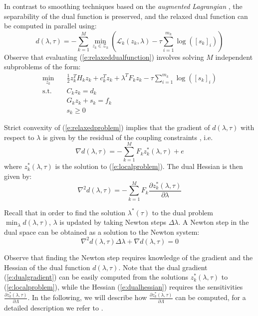 In contrast to smoothing techniques based on the \emph{augmented Lagrangian} \cite{Kozma2013}, the separability of the dual function is preserved, and the relaxed dual function can be computed in parallel using:
\begin{equation}
\label{e:relaxeddualfunction}
d(\lambda, \tau) = -\sum_{k=1}^M \min_{z_k \in \mathcal{Z}_k} \left( \mathcal{L}_k(z_k, \lambda) - \tau \sum_{i=1}^{m_k} \log([s_k]_i) \right)
\end{equation}
Observe that evaluating (\ref{e:relaxeddualfunction}) involves solving $M$ independent subproblems of the form:
\begin{equation}
\label{e:localproblem}
\begin{aligned}
\min_{z_k} & \quad \frac{1}{2}z_k^T H_k z_k + c_k^T z_k + \lambda^TF_k z_k - \tau \sum_{i=1}^{m_k} \log([s_k]_i) \\
\text{s.t.} & \quad C_k z_k = d_k \\ 
& \quad G_k z_k + s_k = f_k \\
& \quad s_k \geq 0
\end{aligned}
\end{equation}

Strict convexity of (\ref{e:relaxedproblem}) implies that the gradient of $d(\lambda, \tau)$ with respect to $\lambda$ is given by the residual of the coupling constraints \cite{Bertsekas1989}, i.e.
\begin{equation}
\label{e:dualgradient}
\nabla d(\lambda, \tau) = -\sum_{k=1}^M F_k z_k^*(\lambda, \tau) + e
\end{equation}
where $z_k^*(\lambda, \tau)$ is the solution to (\ref{e:localproblem}).
The dual Hessian is then given by:
\begin{equation}
\label{e:dualhessian}
\nabla^2 d(\lambda, \tau) = -\sum_{k=1}^M F_k \frac{\partial z_k^*(\lambda, \tau)}{\partial \lambda}
\end{equation}

Recall that in order to find the solution $\lambda^*(\tau)$ to the dual problem $\min_\lambda d(\lambda, \tau)$, $\lambda$ is updated by taking Newton steps $\Delta \lambda$. A Newton step in the dual space can be obtained as a solution to the Newton system:
\begin{equation}
\label{e:NewtonSystem}
\nabla^2 d(\lambda, \tau) \Delta \lambda + \nabla d(\lambda, \tau) = 0
\end{equation}

Observe that finding the Newton step requires knowledge of the gradient and the Hessian of the dual function $d(\lambda, \tau)$. Note that the dual gradient (\ref{e:dualgradient}) can be easily computed from the solutions $z_k^*(\lambda, \tau)$ to (\ref{e:localproblem}), while the Hessian (\ref{e:dualhessian}) requires the sensitivities $\frac{\partial z_k^*(\lambda, \tau)}{\partial \Lambda}$. In the following, we will describe how $\frac{\partial z_k^*(\lambda, \tau)}{\partial \Lambda}$ can be computed, for a detailed description we refer to \cite{Klintberg2014}.

